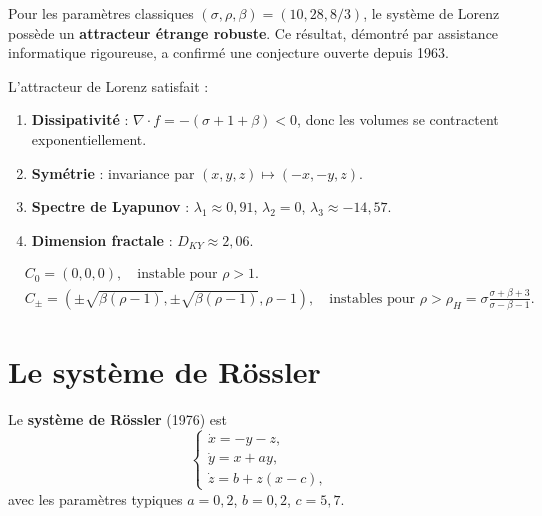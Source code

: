 \begin{theoreme}[Tucker, 2002]
Pour les param\`etres classiques $(\sigma, \rho, \beta) = (10, 28, 8/3)$, le
syst\`eme de Lorenz poss\`ede un \textbf{attracteur \'etrange robuste}. Ce
r\'esultat, d\'emontr\'e par assistance informatique rigoureuse, a confirm\'e
une conjecture ouverte depuis 1963.
\end{theoreme}

\begin{proposition}
L'attracteur de Lorenz satisfait :
\begin{enumerate}
    \item \textbf{Dissipativit\'e} : $\nabla \cdot f = -(\sigma + 1 + \beta) < 0$,
    donc les volumes se contractent exponentiellement.
    \item \textbf{Sym\'etrie} : invariance par $(x, y, z) \mapsto (-x, -y, z)$.
    \item \textbf{Spectre de Lyapunov} : $\lambda_1 \approx 0{,}91$,
    $\lambda_2 = 0$, $\lambda_3 \approx -14{,}57$.
    \item \textbf{Dimension fractale} : $D_{KY} \approx 2{,}06$.
\end{enumerate}
\end{proposition}

\begin{formules}[title=\textbf{Points d'\'equilibre du syst\`eme de Lorenz}]
\begin{align*}
    &C_0 = (0, 0, 0), \quad \text{instable pour } \rho > 1. \\
    &C_{\pm} = (\pm\sqrt{\beta(\rho - 1)}, \pm\sqrt{\beta(\rho - 1)}, \rho - 1),
    \quad \text{instables pour } \rho > \rho_H = \sigma\frac{\sigma + \beta + 3}{\sigma - \beta - 1}.
\end{align*}
\end{formules}

\section{Le syst\`eme de R\"ossler}

\begin{definition}
Le \textbf{syst\`eme de R\"ossler} (1976) est
\[
    \begin{cases}
    \dot{x} = -y - z, \\
    \dot{y} = x + ay, \\
    \dot{z} = b + z(x - c),
    \end{cases}
\]
avec les param\`etres typiques $a = 0{,}2$, $b = 0{,}2$, $c = 5{,}7$.
\end{definition}


